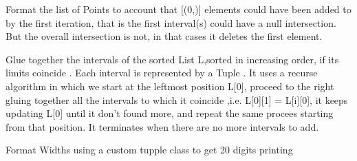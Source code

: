 \documentclass[letterpaper,10pt,english]{sphinxmanual}
\begin{document}

\begin{fulllineitems}
\label{Analisis/Auxiliaryfunctions:Auxiliaryfunctions.FindUnion}
\end{fulllineitems}


\begin{fulllineitems}
\label{Analisis/Auxiliaryfunctions:Auxiliaryfunctions.FormatStart}
Format the list of Points to account that {[}(0,){]} elements could have been added to by the first iteration, that is the first interval(s) could have a null intersection. But the overall intersection is not, in that cases it deletes the first element.

\end{fulllineitems}


\begin{fulllineitems}
\label{Analisis/Auxiliaryfunctions:Auxiliaryfunctions.FormatUnionSet}
Glue together the intervals of the sorted List L,sorted in increasing order, if its limits coincide . Each interval is represented by a Tuple . 
It uses a recurse algorithm in which we start at the leftmost position L{[}0{]}, proceed to the right gluing together all the intervals to which it coincide ,i.e. L{[}0{]}{[}1{]} = L{[}i{]}{[}0{]}, it keeps updating L{[}0{]} until it don't found more, and repeat the same procees starting from that position. It terminates when there are no more intervals to add.

\end{fulllineitems}


\begin{fulllineitems}
\label{Analisis/Auxiliaryfunctions:Auxiliaryfunctions.FormatWidths}
Format Widths using a custom tupple class to get 20 digits printing

\end{fulllineitems}
\end{document}

